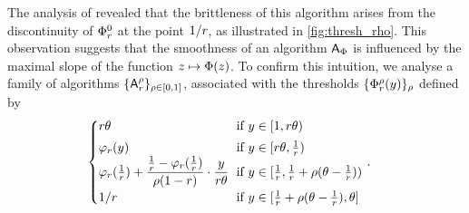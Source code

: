 The analysis of \citet{benomar2025tradeoffs} revealed that the brittleness of this algorithm arises from the discontinuity of $\Phi^0_r$ at the point $1/r$, as illustrated in  \cref{fig:thresh_rho}. This observation suggests that the smoothness of an algorithm $\mbox{\textup{\textsf{A}}}_\Phi$ is influenced by the maximal slope of the function $z \mapsto \Phi(z)$. 
To confirm this intuition,  we analyse a family of algorithms $\{\mbox{\textup{\textsf{A}}}_{r}^{\rho}\}_{\rho \in [0,1]}$, associated with the thresholds %
$\{\Phi^\rho_r(y)\}_\rho$ defined by
\begin{equation}
\hspace{-1em}\left\{
 \begin{array}{lll}
    \hspace{-5pt}\rob \ub & \hspace{-4pt}\mbox{if } y \in [1,\rob \ub) \\[5pt]
     \hspace{-5pt}\varphi_\rob(y) & \hspace{-4pt}\mbox{if } \pred \in [\rob \ub, \tfrac{1}{\rob})\\
     \hspace{-5pt}\varphi_\rob(\tfrac{1}{\rob}) + \dfrac{\tfrac{1}{\rob} - \varphi_\rob(\tfrac{1}{\rob})}{\rho (1-\rob)} \cdot \dfrac{\pred}{\rob \ub} & \hspace{-4pt}\mbox{if } \pred \in [\tfrac{1}{\rob}, \tfrac{1}{\rob} + \rho(\ub - \tfrac{1}{\rob}))\\[8pt]
     \hspace{-5pt}1/\rob & \hspace{-4pt}\mbox{if } \pred \in [\tfrac{1}{\rob} + \rho(\ub - \tfrac{1}{\rob}), \ub]
\end{array}
\right. \hspace{-4pt}.
\label{eq:rho.family}
\end{equation}

